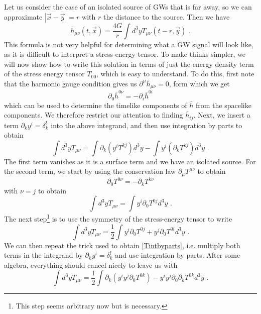\documentclass[11pt]{cuthesis}
\newcommand{\mn}{_{\mu\nu}}
\newcommand{\fs}{\text{ .}}
\begin{document}
Let us consider the case of an isolated source of GWs that is far away, so we can approximate $|\vec{x} - \vec{y}| = r$ with $r$ the distance to the source. Then we have
\begin{equation} \label{hbarmn}
\bar{h}\mn (t,\vec{x}) = \frac{4G}{r} \int d^3 y  T\mn (t-r,\vec{y}) \fs
\end{equation}
This formula is not very helpful for determining what a GW signal will look like, as it is difficult to interpret a stress-energy tensor. To make thinks simpler, we will now show how to write this solution in terms of just the energy density term of the stress energy tensor $T_{00}$, which is easy to understand. To do this, first note that the harmonic gauge condition gives us $\partial^\mu \bar{h}\mn = 0$, form which we get
\begin{equation}
 \partial_0 \bar{h}^{0\nu} = -\partial_i \bar{h}^{0i}
\end{equation}
which can be used to determine the timelike components of $\bar{h}$ from the spacelike components. We therefore restrict our attention to finding $\bar{h}_{ij}$. Next, we insert a term $\partial_k y^i = \delta_k^l$ into the above integrand, and then use integration by parts to obtain
\begin{equation} \label{Tintbyparts}
\int d^3 y  T\mn = \int  \partial_k(y^i T^{kj}) d^3 y - \int   y^i (\partial_k T^{kj}) d^3 y \fs
\end{equation}
The first term vanishes as it is a surface term and we have an isolated source. For the second term, we start by using the conservation law $\partial_\mu T^{\mu \nu}$ to obtain
\begin{equation}
\partial_0 T^{0\nu} = -\partial_k T^{k\nu} 
\end{equation} 
with $\nu = j$ to obtain
\begin{equation} \label{Tmn}
\int d^3 y  T\mn = \int y^i \partial_0 T^{0j} d^3 y \fs
\end{equation}
The next step\footnote{This step seems arbitrary now but is necessary.} is to use the symmetry of the stress-energy tensor to write
\begin{equation}
\int d^3 y  T\mn = \frac{1}{2}\int y^i \partial_0 T^{0j} + y^j \partial_0 T^{0i}d^3 y \fs
\end{equation}
We can then repeat the trick used to obtain \ref{Tintbyparts}, i.e. multiply both terms in the integrand by $\partial_k y^i = \delta_k^l$ and use integration by parts. After some algebra, everything should cancel nicely to leave us with 
\begin{equation}
\int d^3 y  T\mn = \frac{1}{2}\int \partial_k (y^i y^j \partial_0 T^{0k}) - y^i y^j \partial_0 \partial_k T^{0k}d^3 y \fs
\end{equation}
\end{document}
